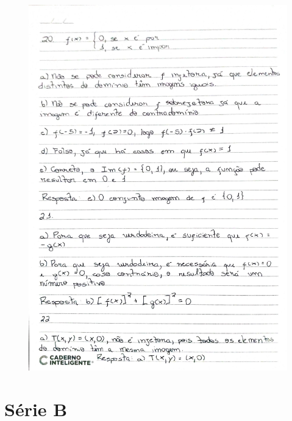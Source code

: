 \documentclass[
  12pt,     %
  openright,      %
  oneside,      %
  a4paper     %
  ]{abntex2}
\begin{document}
\begin{figure}[H]
  \centering
  \includegraphics[scale=0.23]{pagina10.jpg}
\end{figure}
\section{Série B}
\end{document}
